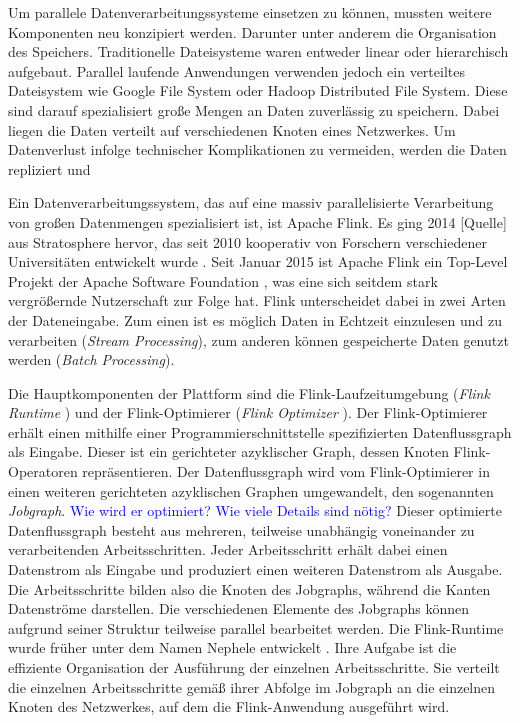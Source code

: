 Um parallele Datenverarbeitungssysteme einsetzen zu können, mussten weitere Komponenten neu konzipiert werden. Darunter unter anderem die Organisation des Speichers. Traditionelle Dateisysteme waren entweder linear oder hierarchisch aufgebaut. Parallel laufende Anwendungen verwenden jedoch ein verteiltes Dateisystem wie Google File System oder Hadoop Distributed File System. Diese sind darauf spezialisiert große Mengen an Daten zuverlässig zu speichern. Dabei liegen die Daten verteilt auf verschiedenen Knoten eines Netzwerkes. Um Datenverlust infolge technischer Komplikationen zu vermeiden, werden die Daten repliziert und 

Ein Datenverarbeitungssystem, das auf eine massiv parallelisierte Verarbeitung von großen Datenmengen spezialisiert ist, ist Apache Flink. Es ging 2014 [Quelle] aus Stratosphere hervor, das seit 2010 kooperativ von Forschern verschiedener Universitäten entwickelt wurde \cite{Battre2010, Alexandrov2014}. Seit Januar 2015 ist Apache Flink ein Top-Level Projekt der Apache Software Foundation \cite{ApacheFlinkBlogEntry}, was eine sich seitdem stark vergrößernde Nutzerschaft zur Folge hat. Flink unterscheidet dabei in zwei Arten der Dateneingabe. Zum einen ist es möglich Daten in Echtzeit einzulesen und zu verarbeiten (\textit{Stream Processing}), zum anderen können gespeicherte Daten genutzt werden (\textit{Batch Processing}). 

Die Hauptkomponenten der Plattform sind die Flink-Laufzeitumgebung (\textit{Flink Runtime} ) und der Flink-Optimierer (\textit{Flink Optimizer} ). Der Flink-Optimierer erhält einen mithilfe einer Programmierschnittstelle spezifizierten Datenflussgraph als Eingabe. Dieser ist ein gerichteter azyklischer Graph, dessen Knoten Flink-Operatoren repräsentieren. Der Datenflussgraph wird vom Flink-Optimierer in einen weiteren gerichteten azyklischen Graphen umgewandelt, den sogenannten \textit{Jobgraph}. \textcolor{blue}{Wie wird er optimiert? Wie viele Details sind nötig?}
Dieser optimierte Datenflussgraph besteht aus mehreren, teilweise unabhängig voneinander zu verarbeitenden Arbeitsschritten. Jeder Arbeitsschritt erhält dabei einen Datenstrom als Eingabe und produziert einen weiteren Datenstrom als Ausgabe. Die Arbeitsschritte bilden also die Knoten des Jobgraphs, während die Kanten Datenströme darstellen. Die verschiedenen Elemente des Jobgraphs können aufgrund seiner Struktur teilweise parallel bearbeitet werden. 
Die Flink-Runtime wurde früher unter dem Namen Nephele entwickelt \cite{Warneke2009}. Ihre Aufgabe ist die effiziente Organisation der Ausführung der einzelnen Arbeitsschritte. Sie verteilt die einzelnen Arbeitsschritte gemäß ihrer Abfolge im Jobgraph an die einzelnen Knoten des Netzwerkes, auf dem die Flink-Anwendung ausgeführt wird. 

